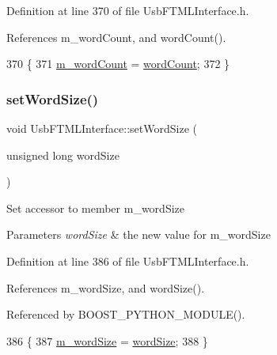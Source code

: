 Definition at line 370 of file Usb\+F\+T\+M\+L\+Interface.\+h.



References m\+\_\+word\+Count, and word\+Count().


\begin{DoxyCode}
370                                               \{
371     \hyperlink{classUsbFTMLInterface_ab7f4399ef367c08ffe1f7034f133986e}{m\_wordCount} = \hyperlink{classUsbFTMLInterface_a844ab72bfe0d3e14dd16f607a7c14905}{wordCount};
372   \}
\end{DoxyCode}
\mbox{\label{classUsbFTMLInterface_a8f54e893ac36ae74bd4702ae649b79dd}} 
\subsubsection{\texorpdfstring{set\+Word\+Size()}{setWordSize()}}
{\footnotesize\ttfamily void Usb\+F\+T\+M\+L\+Interface\+::set\+Word\+Size (\begin{DoxyParamCaption}\item[{unsigned long}]{word\+Size }\end{DoxyParamCaption})\hspace{0.3cm}{\ttfamily [inline]}}

Set accessor to member m\+\_\+word\+Size 
\begin{DoxyParams}{Parameters}
{\em word\+Size} & the new value for m\+\_\+word\+Size \\
\hline
\end{DoxyParams}


Definition at line 386 of file Usb\+F\+T\+M\+L\+Interface.\+h.



References m\+\_\+word\+Size, and word\+Size().



Referenced by B\+O\+O\+S\+T\+\_\+\+P\+Y\+T\+H\+O\+N\+\_\+\+M\+O\+D\+U\+L\+E().


\begin{DoxyCode}
386                                             \{
387     \hyperlink{classUsbFTMLInterface_a39a8dfbe54cc29e033fa2a4d5fbbc982}{m\_wordSize} = \hyperlink{classUsbFTMLInterface_ac313f412cbda6222ef817cb46083e2b3}{wordSize};
388   \}
\end{DoxyCode}
\mbox{\label{classUsbFTMLInterface_ab9ff3b850ed592872bd82c579052114f}} 
